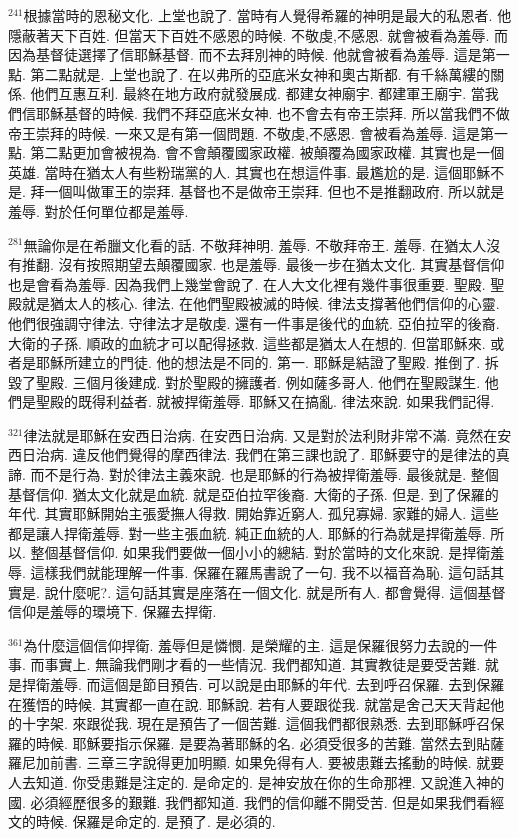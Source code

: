 \documentclass{book}
\begin{document}
$^{241}$根據當時的恩秘文化.
上堂也說了.
當時有人覺得希羅的神明是最大的私恩者.
他隱蔽著天下百姓.
但當天下百姓不感恩的時候.
不敬虔,不感恩.
就會被看為羞辱.
而因為基督徒選擇了信耶穌基督.
而不去拜別神的時候.
他就會被看為羞辱.
這是第一點.
第二點就是.
上堂也說了.
在以弗所的亞底米女神和奧古斯都.
有千絲萬縷的關係.
他們互惠互利.
最終在地方政府就發展成.
都建女神廟宇.
都建軍王廟宇.
當我們信耶穌基督的時候.
我們不拜亞底米女神.
也不會去有帝王崇拜.
所以當我們不做帝王崇拜的時候.
一來又是有第一個問題.
不敬虔,不感恩.
會被看為羞辱.
這是第一點.
第二點更加會被視為.
會不會顛覆國家政權.
被顛覆為國家政權.
其實也是一個英雄.
當時在猶太人有些粉瑞黨的人.
其實也在想這件事.
最尷尬的是.
這個耶穌不是.
拜一個叫做軍王的崇拜.
基督也不是做帝王崇拜.
但也不是推翻政府.
所以就是羞辱.
對於任何單位都是羞辱.

$^{281}$無論你是在希臘文化看的話.
不敬拜神明.
羞辱.
不敬拜帝王.
羞辱.
在猶太人沒有推翻.
沒有按照期望去顛覆國家.
也是羞辱.
最後一步在猶太文化.
其實基督信仰也是會看為羞辱.
因為我們上幾堂會說了.
在人大文化裡有幾件事很重要.
聖殿.
聖殿就是猶太人的核心.
律法.
在他們聖殿被滅的時候.
律法支撐著他們信仰的心靈.
他們很強調守律法.
守律法才是敬虔.
還有一件事是後代的血統.
亞伯拉罕的後裔.
大衛的子孫.
順政的血統才可以配得拯救.
這些都是猶太人在想的.
但當耶穌來.
或者是耶穌所建立的門徒.
他的想法是不同的.
第一.
耶穌是結證了聖殿.
推倒了.
拆毀了聖殿.
三個月後建成.
對於聖殿的擁護者.
例如薩多哥人.
他們在聖殿謀生.
他們是聖殿的既得利益者.
就被捍衛羞辱.
耶穌又在搞亂.
律法來說.
如果我們記得.

$^{321}$律法就是耶穌在安西日治病.
在安西日治病.
又是對於法利財非常不滿.
竟然在安西日治病.
違反他們覺得的摩西律法.
我們在第三課也說了.
耶穌要守的是律法的真諦.
而不是行為.
對於律法主義來說.
也是耶穌的行為被捍衛羞辱.
最後就是.
整個基督信仰.
猶太文化就是血統.
就是亞伯拉罕後裔.
大衛的子孫.
但是.
到了保羅的年代.
其實耶穌開始主張愛撫人得救.
開始靠近窮人.
孤兒寡婦.
家難的婦人.
這些都是讓人捍衛羞辱.
對一些主張血統.
純正血統的人.
耶穌的行為就是捍衛羞辱.
所以.
整個基督信仰.
如果我們要做一個小小的總結.
對於當時的文化來說.
是捍衛羞辱.
這樣我們就能理解一件事.
保羅在羅馬書說了一句.
我不以福音為恥.
這句話其實是.
說什麼呢?.
這句話其實是座落在一個文化.
就是所有人.
都會覺得.
這個基督信仰是羞辱的環境下.
保羅去捍衛.

$^{361}$為什麼這個信仰捍衛.
羞辱但是憐憫.
是榮耀的主.
這是保羅很努力去說的一件事.
而事實上.
無論我們剛才看的一些情況.
我們都知道.
其實教徒是要受苦難.
就是捍衛羞辱.
而這個是節目預告.
可以說是由耶穌的年代.
去到呼召保羅.
去到保羅在獲悟的時候.
其實都一直在說.
耶穌說.
若有人要跟從我.
就當是舍己天天背起他的十字架.
來跟從我.
現在是預告了一個苦難.
這個我們都很熟悉.
去到耶穌呼召保羅的時候.
耶穌要指示保羅.
是要為著耶穌的名.
必須受很多的苦難.
當然去到貼薩羅尼加前書.
三章三字說得更加明顯.
如果免得有人.
要被患難去搖動的時候.
就要人去知道.
你受患難是注定的.
是命定的.
是神安放在你的生命那裡.
又說進入神的國.
必須經歷很多的艱難.
我們都知道.
我們的信仰離不開受苦.
但是如果我們看經文的時候.
保羅是命定的.
是預了.
是必須的.
\end{document}
